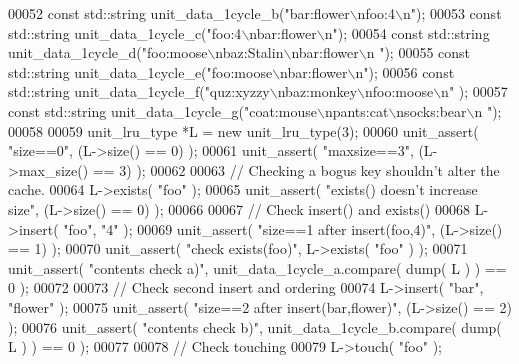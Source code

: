 \begin{DoxyCode}
00052         \textcolor{keyword}{const} std::string unit\_data\_1cycle\_b(\textcolor{stringliteral}{"bar:flower\(\backslash\)nfoo:4\(\backslash\)n"});
00053         \textcolor{keyword}{const} std::string unit\_data\_1cycle\_c(\textcolor{stringliteral}{"foo:4\(\backslash\)nbar:flower\(\backslash\)n"});
00054         \textcolor{keyword}{const} std::string unit\_data\_1cycle\_d(\textcolor{stringliteral}{"foo:moose\(\backslash\)nbaz:Stalin\(\backslash\)nbar:flower\(\backslash\)n
      "});
00055         \textcolor{keyword}{const} std::string unit\_data\_1cycle\_e(\textcolor{stringliteral}{"foo:moose\(\backslash\)nbar:flower\(\backslash\)n"});
00056         \textcolor{keyword}{const} std::string unit\_data\_1cycle\_f(\textcolor{stringliteral}{"quz:xyzzy\(\backslash\)nbaz:monkey\(\backslash\)nfoo:moose\(\backslash\)n"
      });
00057         \textcolor{keyword}{const} std::string unit\_data\_1cycle\_g(\textcolor{stringliteral}{"coat:mouse\(\backslash\)npants:cat\(\backslash\)nsocks:bear\(\backslash\)n
      "});
00058 
00059         unit_lru_type *L = \textcolor{keyword}{new} unit_lru_type(3);
00060         unit_assert( \textcolor{stringliteral}{"size==0"}, (L->size() == 0) );
00061         unit_assert( \textcolor{stringliteral}{"maxsize==3"}, (L->max_size() == 3) );
00062 
00063         \textcolor{comment}{// Checking a bogus key shouldn't alter the cache.}
00064         L->exists( \textcolor{stringliteral}{"foo"} );
00065         unit_assert( \textcolor{stringliteral}{"exists() doesn't increase size"}, (L->size() == 0) );
00066 
00067         \textcolor{comment}{// Check insert() and exists()}
00068         L->insert( \textcolor{stringliteral}{"foo"}, \textcolor{stringliteral}{"4"} );
00069         unit_assert( \textcolor{stringliteral}{"size==1 after insert(foo,4)"}, (L->size() == 1) );
00070         unit_assert( \textcolor{stringliteral}{"check exists(foo)"}, L->exists( \textcolor{stringliteral}{"foo"} ) );
00071         unit_assert( \textcolor{stringliteral}{"contents check a)"}, unit\_data\_1cycle\_a.compare( dump( L ) )
       == 0 );
00072 
00073         \textcolor{comment}{// Check second insert and ordering}
00074         L->insert( \textcolor{stringliteral}{"bar"}, \textcolor{stringliteral}{"flower"} );
00075         unit_assert( \textcolor{stringliteral}{"size==2 after insert(bar,flower)"}, (L->size() == 2) );
00076         unit_assert( \textcolor{stringliteral}{"contents check b)"}, unit\_data\_1cycle\_b.compare( dump( L ) )
       == 0 );
00077 
00078         \textcolor{comment}{// Check touching}
00079         L->touch( \textcolor{stringliteral}{"foo"} );

\end{DoxyCode}
